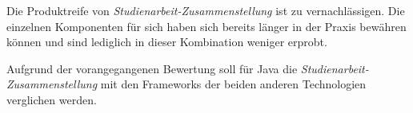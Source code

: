 Die Produktreife von \emph{Studienarbeit-Zusammenstellung} ist zu vernachlässigen. Die einzelnen Komponenten für sich haben sich bereits länger in der Praxis bewähren können und sind lediglich in dieser Kombination weniger erprobt.

Aufgrund der vorangegangenen Bewertung soll für Java die \emph{Studienarbeit-Zusammenstellung} mit den Frameworks der beiden anderen Technologien verglichen werden.